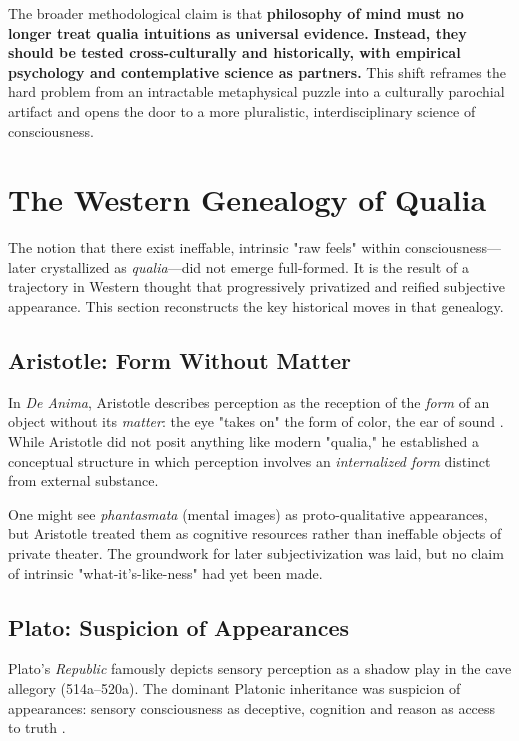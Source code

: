 \documentclass[11pt,a4paper]{article}
\newcommand{\qualia}{\emph{qualia}}
\begin{document}
The broader methodological claim is that \textbf{philosophy of mind must no longer treat qualia intuitions as universal evidence. Instead, they should be tested cross-culturally and historically, with empirical psychology and contemplative science as partners.} This shift reframes the hard problem from an intractable metaphysical puzzle into a culturally parochial artifact and opens the door to a more pluralistic, interdisciplinary science of consciousness.

\section{The Western Genealogy of Qualia}

The notion that there exist ineffable, intrinsic "raw feels" within consciousness—later crystallized as \qualia{}—did not emerge full-formed. It is the result of a trajectory in Western thought that progressively privatized and reified subjective appearance. This section reconstructs the key historical moves in that genealogy.

\subsection{Aristotle: Form Without Matter}

In \emph{De Anima}, Aristotle describes perception as the reception of the \emph{form} of an object without its \emph{matter}: the eye "takes on" the form of color, the ear of sound \cite{aristotle1984, sorabji1974, johansen1997}. While Aristotle did not posit anything like modern "qualia," he established a conceptual structure in which perception involves an \emph{internalized form} distinct from external substance.

One might see \emph{phantasmata} (mental images) as proto-qualitative appearances, but Aristotle treated them as cognitive resources rather than ineffable objects of private theater. The groundwork for later subjectivization was laid, but no claim of intrinsic "what-it's-like-ness" had yet been made.

\subsection{Plato: Suspicion of Appearances}

Plato's \emph{Republic} famously depicts sensory perception as a shadow play in the cave allegory (514a–520a). The dominant Platonic inheritance was suspicion of appearances: sensory consciousness as deceptive, cognition and reason as access to truth \cite{burnyeat1990}.
\end{document}
